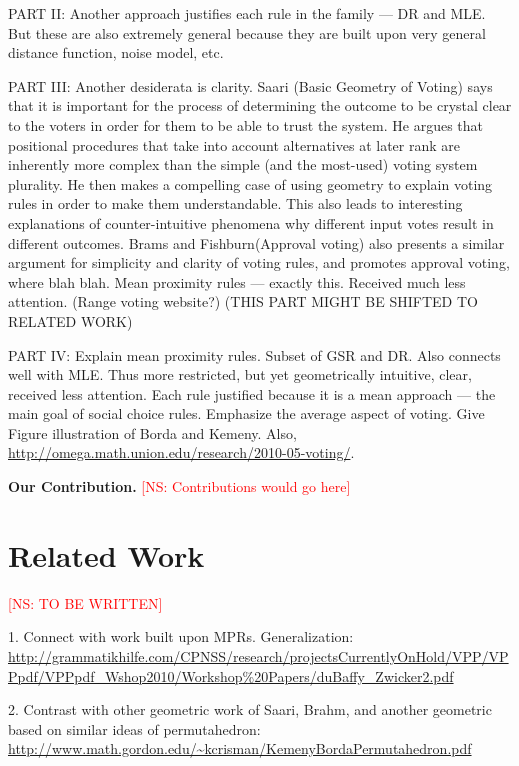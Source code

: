 \documentclass[prodmode,acmec]{ec-acmsmall}
\newcommand{\kibitz}[2]{\ifnum\Comments=1\textcolor{#1}{#2}\fi}
\newcommand{\ns}[1]{\kibitz{red} {[NS: #1]}}
\begin{document}
PART II: Another approach justifies each rule in the family --- DR and MLE. But these are also extremely general because they are built upon very general distance function, noise model, etc. 

PART III: Another desiderata is clarity. Saari (Basic Geometry of Voting) says that it is important for the process of determining the outcome to be crystal clear to the voters in order for them to be able to trust the system. He argues that positional procedures that take into account alternatives at later rank are inherently more complex than the simple (and the most-used) voting system plurality. He then makes a compelling case of using geometry to explain voting rules in order to make them understandable. This also leads to interesting explanations of counter-intuitive phenomena why different input votes result in different outcomes. Brams and Fishburn(Approval voting) also presents a similar argument for simplicity and clarity of voting rules, and promotes approval voting, where blah blah. Mean proximity rules --- exactly this. Received much less attention. (Range voting website?) (THIS PART MIGHT BE SHIFTED TO RELATED WORK)

PART IV: Explain mean proximity rules. Subset of GSR and DR. Also connects well with MLE. Thus more restricted, but yet geometrically intuitive, clear, received less attention. Each rule justified because it is a mean approach --- the main goal of social choice rules. Emphasize the average aspect of voting. Give Figure illustration of Borda and Kemeny. Also, \url{http://omega.math.union.edu/research/2010-05-voting/}. 

\noindent \textbf{Our Contribution.} \ns{Contributions would go here}

\section{Related Work}
\ns{TO BE WRITTEN}

1. Connect with work built upon MPRs. Generalization: \url{http://grammatikhilfe.com/CPNSS/research/projectsCurrentlyOnHold/VPP/VPPpdf/VPPpdf_Wshop2010/Workshop%20Papers/duBaffy_Zwicker2.pdf}


2. Contrast with other geometric work of Saari, Brahm, and another geometric based on similar ideas of permutahedron: \url{http://www.math.gordon.edu/~kcrisman/KemenyBordaPermutahedron.pdf}
\end{document}

